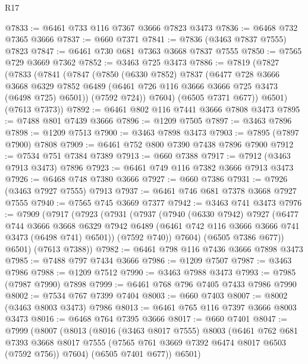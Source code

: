 \begin{lexlean}{R17}
\begin{coremodule}
@7833 := @6461 @733 @116 @7367 @3666 @7823 @3473
@7836 := @6468 @732 @7365 @3666
@7837 := @660 @7371
@7841 := @7836 (@3463 @7837 @7555) @7823
@7847 := @6461 @730 @681 @7363 @3668 @7837 @7555
@7850 := @7565 @729 @3669 @7362
@7852 := @3463 @725 @3473
@7886 := @7819
    (@7827
      (@7833
        (@7841
          (@7847
            (@7850
              (@6330 @7852)
              @7837
              (@6477
                @728
                @3666
                @3668
                @6329
                @7852
                @6489
                (@6461 @726 @116 @3666 @3666 @725 @3473 (@6498 @725) @6501))
              (@7592 @724))
            @7604)
          (@6505 @7371 @677))
        @6501)
      (@7613 @7373))
@7892 := @6461 @802 @116 @7441 @3666 @7808 @3473
@7895 := @7488 @801 @7439 @3666
@7896 := @1209 @7505
@7897 := @3463 @7896
@7898 := @1209 @7513
@7900 := @3463 @7898 @3473
@7903 := @7895 (@7897 @7900) @7808
@7909 := @6461 @752 @800 @7390 @7438 @7896 @7900
@7912 := @7534 @751 @7384 @7389
@7913 := @660 @7388
@7917 := @7912 (@3463 @7913 @3473) @7896
@7923 := @6461 @749 @116 @7382 @3666 @7913 @3473
@7926 := @6468 @748 @7380 @3666
@7927 := @660 @7386
@7931 := @7926 (@3463 @7927 @7555) @7913
@7937 := @6461 @746 @681 @7378 @3668 @7927 @7555
@7940 := @7565 @745 @3669 @7377
@7942 := @3463 @741 @3473
@7976 := @7909
    (@7917
      (@7923
        (@7931
          (@7937
            (@7940
              (@6330 @7942)
              @7927
              (@6477
                @744
                @3666
                @3668
                @6329
                @7942
                @6489
                (@6461 @742 @116 @3666 @3666 @741 @3473 (@6498 @741) @6501))
              (@7592 @740))
            @7604)
          (@6505 @7386 @677))
        @6501)
      (@7613 @7388))
@7982 := @6461 @798 @116 @7436 @3666 @7898 @3473
@7985 := @7488 @797 @7434 @3666
@7986 := @1209 @7507
@7987 := @3463 @7986
@7988 := @1209 @7512
@7990 := @3463 @7988 @3473
@7993 := @7985 (@7987 @7990) @7898
@7999 := @6461 @768 @796 @7405 @7433 @7986 @7990
@8002 := @7534 @767 @7399 @7404
@8003 := @660 @7403
@8007 := @8002 (@3463 @8003 @3473) @7986
@8013 := @6461 @765 @116 @7397 @3666 @8003 @3473
@8016 := @6468 @764 @7395 @3666
@8017 := @660 @7401
@8047 := @7999
    (@8007
      (@8013
        (@8016
          (@3463 @8017 @7555)
          @8003
          (@6461
            @762
            @681
            @7393
            @3668
            @8017
            @7555
            (@7565 @761 @3669 @7392 @6474 @8017 @6503 (@7592 @756))
            @7604)
          (@6505 @7401 @677))
        @6501)

\end{coremodule}
\end{lexlean}
